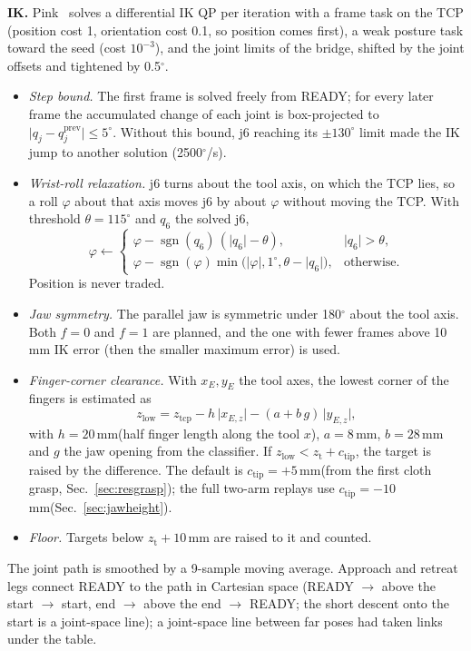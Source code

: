 \documentclass[conference,10pt]{IEEEtran}
\newcommand{\mm}{\,mm\xspace}
\DeclareMathOperator{\sgn}{sgn}
\begin{document}
\textbf{IK.} Pink~\cite{pink} solves a differential IK QP per iteration with a frame task on the TCP (position cost 1,
orientation cost 0.1, so position comes first), a weak posture task toward the seed (cost $10^{-3}$), and the joint limits
of the bridge, shifted by the joint offsets and tightened by 0.5$^\circ$.
\begin{itemize}
\item \emph{Step bound.} The first frame is solved freely from READY; for every later frame the accumulated change of each
  joint is box-projected to $\lvert q_j-q_j^{\mathrm{prev}}\rvert\le5^\circ$. Without this bound, j6 reaching its
  $\pm130^\circ$ limit made the IK jump to another solution (2500$^\circ$/s).
\item \emph{Wrist-roll relaxation.} j6 turns about the tool axis, on which the TCP lies, so a roll $\varphi$ about that axis
  moves j6 by about $\varphi$ without moving the TCP. With threshold $\theta=115^\circ$ and $q_6$ the solved j6,
  \begin{equation}
  \varphi\leftarrow\begin{cases}\varphi-\sgn(q_6)\,(\lvert q_6\rvert-\theta), & \lvert q_6\rvert>\theta,\\
  \varphi-\sgn(\varphi)\min\big(\lvert\varphi\rvert,1^\circ,\theta-\lvert q_6\rvert\big), & \text{otherwise.}\end{cases}
  \end{equation}
  Position is never traded.
\item \emph{Jaw symmetry.} The parallel jaw is symmetric under 180$^\circ$ about the tool axis. Both $f=0$ and $f=1$ are
  planned, and the one with fewer frames above 10\mm IK error (then the smaller maximum error) is used.
\item \emph{Finger-corner clearance.} With $x_E,y_E$ the tool axes, the lowest corner of the fingers is estimated as
  \begin{equation}
  z_\mathrm{low}=z_\mathrm{tcp}-h\,\lvert x_{E,z}\rvert-(a+b\,g)\,\lvert y_{E,z}\rvert,
  \end{equation}
  with $h=20$\mm (half finger length along the tool $x$), $a=8$\mm, $b=28$\mm and $g$ the jaw opening from the classifier.
  If $z_\mathrm{low}<z_\mathrm{t}+c_\mathrm{tip}$, the target is raised by the difference. The default is
  $c_\mathrm{tip}=+5$\mm (from the first cloth grasp, Sec.~\ref{sec:resgrasp}); the full two-arm replays use
  $c_\mathrm{tip}=-10$\mm (Sec.~\ref{sec:jawheight}).
\item \emph{Floor.} Targets below $z_\mathrm{t}+10$\mm are raised to it and counted.
\end{itemize}
The joint path is smoothed by a 9-sample moving average. Approach and retreat legs connect READY to the path in Cartesian
space (READY $\to$ above the start $\to$ start, end $\to$ above the end $\to$ READY; the short descent onto the start is a
joint-space line); a joint-space line between far poses had taken links under the table.
\end{document}
